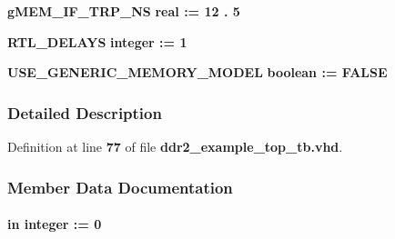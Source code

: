 \begin{DoxyCompactItemize}
\item 
{\bf g\+M\+E\+M\+\_\+\+I\+F\+\_\+\+T\+R\+P\+\_\+\+NS} {\bfseries {\bfseries \textcolor{comment}{real}\textcolor{vhdlchar}{ }\textcolor{vhdlchar}{ }\textcolor{vhdlchar}{\+:}\textcolor{vhdlchar}{=}\textcolor{vhdlchar}{ }\textcolor{vhdlchar}{ } \textcolor{vhdldigit}{12} \textcolor{vhdlchar}{.} \textcolor{vhdldigit}{5} \textcolor{vhdlchar}{ }}} 
\item 
{\bf R\+T\+L\+\_\+\+D\+E\+L\+A\+YS} {\bfseries {\bfseries \textcolor{comment}{integer}\textcolor{vhdlchar}{ }\textcolor{vhdlchar}{ }\textcolor{vhdlchar}{\+:}\textcolor{vhdlchar}{=}\textcolor{vhdlchar}{ }\textcolor{vhdlchar}{ } \textcolor{vhdldigit}{1} \textcolor{vhdlchar}{ }}} 
\item 
{\bf U\+S\+E\+\_\+\+G\+E\+N\+E\+R\+I\+C\+\_\+\+M\+E\+M\+O\+R\+Y\+\_\+\+M\+O\+D\+EL} {\bfseries {\bfseries \textcolor{comment}{boolean}\textcolor{vhdlchar}{ }\textcolor{vhdlchar}{ }\textcolor{vhdlchar}{\+:}\textcolor{vhdlchar}{=}\textcolor{vhdlchar}{ }\textcolor{vhdlchar}{ }\textcolor{vhdlchar}{ }\textcolor{vhdlchar}{ }\textcolor{vhdlchar}{F\+A\+L\+SE}\textcolor{vhdlchar}{ }}} 
\end{DoxyCompactItemize}


\subsubsection{Detailed Description}


Definition at line {\bf 77} of file {\bf ddr2\+\_\+example\+\_\+top\+\_\+tb.\+vhd}.



\subsubsection{Member Data Documentation}
\paragraph[{B\+O\+A\+R\+D\+\_\+\+C\+L\+K\+\_\+\+D\+E\+L\+AY}]{ {\bfseries \textcolor{keywordflow}{in}\textcolor{vhdlchar}{ }} {\bfseries \textcolor{comment}{integer}\textcolor{vhdlchar}{ }\textcolor{vhdlchar}{ }\textcolor{vhdlchar}{\+:}\textcolor{vhdlchar}{=}\textcolor{vhdlchar}{ }\textcolor{vhdlchar}{ } \textcolor{vhdldigit}{0} \textcolor{vhdlchar}{ }} \hspace{0.3cm}{\ttfamily [Generic]}}\label{classddr2__example__top__tb_a2777bebaf569c1dbc28917723114672f}


